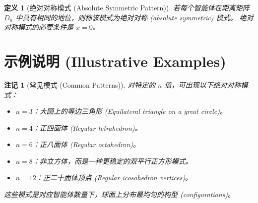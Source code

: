 \documentclass{ctexart}
\newtheorem{definition}[theorem]{定义}
\newtheorem{remark}[theorem]{注记}
\begin{document}
\begin{definition}[绝对对称模式 (Absolute Symmetric Pattern)]
若每个智能体在距离矩阵 $D_n$ 中具有相同的地位，则称该模式为\textit{绝对对称 (absolute symmetric)} 模式。
绝对对称模式的必要条件是 $\bar{x} = 0$。
\end{definition}

\section{示例说明 (Illustrative Examples)}

\begin{remark}[常见模式 (Common Patterns)]
对特定的 $n$ 值，可出现以下绝对对称模式：
\begin{itemize}
    \item $n = 3$：大圆上的等边三角形 (Equilateral triangle on a great circle)。
    \item $n = 4$：正四面体 (Regular tetrahedron)。
    \item $n = 6$：正八面体 (Regular octahedron)。
    \item $n = 8$：非立方体，而是一种更稳定的双平行正方形模式。
    \item $n = 12$：正二十面体顶点 (Regular icosahedron vertices)。
\end{itemize}
这些模式是对应智能体数量下，球面上分布最均匀的构型 (configurations)。
\end{remark}
\end{document}
